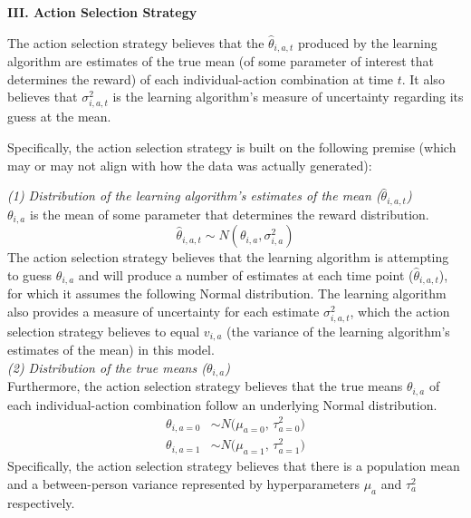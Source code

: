 \documentclass[letterpaper, 11pt]{extarticle}
\begin{document}
\textsf{\textbf {III. Action Selection Strategy}}

The action selection strategy believes that the $\hat{\theta}_{i,a,t}$ produced by the learning algorithm are estimates of the true mean (of some parameter of interest that determines the reward) of each individual-action combination at time $t$. It also believes that $\sigma^2_{i,a,t}$ is the learning algorithm's measure of uncertainty regarding its guess at the mean. 

Specifically, the action selection strategy is built on the following premise (which may or may not align with how the data was actually generated):

\begin{problem}

\textit{(1) Distribution of the learning algorithm's estimates of the mean ($\hat{\theta}_{i,a,t}$)}\\

$\theta_{i,a}$ is the mean of some parameter that determines the reward distribution. 
$$\hat{\theta}_{i,a,t} \sim N(\theta_{i,a}, \sigma^2_{i,a})$$
The action selection strategy believes that the learning algorithm is attempting to guess $\theta_{i,a}$ and will produce a number of estimates at each time point ($\hat{\theta}_{i,a,t}$), for which it assumes the following Normal distribution. The learning algorithm also provides a measure of uncertainty for each estimate $\sigma^2_{i,a,t}$, which the action selection strategy believes to equal $v_{i,a}$ (the variance of the learning algorithm's estimates of the mean) in this model.\\

\textit{(2) Distribution of the true means ($\theta_{i,a}$)}\\

Furthermore, the action selection strategy believes that the true means $\theta_{i,a}$ of each individual-action combination follow an underlying Normal distribution.
\begin{align*}
    \theta_{i,{a=0}} &\sim N\!\big(\mu_{a=0}, \, \tau_{a=0}^{2}\big)\\
    \theta_{i,{a=1}} &\sim N\!\big(\mu_{a=1}, \, \tau_{a=1}^{2}\big)
\end{align*}
Specifically, the action selection strategy believes that there is a population mean and a between-person variance represented by hyperparameters $\mu_{a}$ and $\tau_{a}^{2}$ respectively. 

\end{problem}
\end{document}

